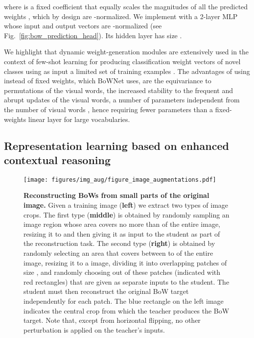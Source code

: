 \documentclass[final]{cvpr}
\begin{document}
where  is a fixed coefficient that equally scales the magnitudes of all the predicted weights , which by design are -normalized.
We implement  with a 2-layer MLP whose input and output vectors are -normalized (see Fig.~\ref{fig:bow_prediction_head}).
Its hidden layer has size .

We highlight that dynamic weight-generation modules are extensively used in the context of few-shot learning for producing classification weight vectors of novel classes using as input a limited set of training examples
\cite{gidaris2018dynamic,gomez2005evolving, qiao2018few}.
The advantages of using  instead of fixed weights, which BoWNet uses, are the equivariance to permutations of the visual words, the increased stability to the frequent and abrupt updates of the visual 
words, a number of parameters  independent from the number of visual words , hence requiring fewer parameters than a fixed-weights linear layer for large vocabularies.

\subsection{Representation learning based on enhanced contextual reasoning} \label{sec:contextual_reasoning_skills}

\begin{figure}[t]
\renewcommand{\captionfont}{\small}
\renewcommand{\captionlabelfont}{\bf}
\begin{center}
\texttt{[image: figures/img\_aug/figure\_image\_augmentations.pdf]}
\end{center}
\vspace{-15pt}
   \caption{
   \textbf{Reconstructing BoWs from small parts of the original image.}
   Given a training image (\textbf{left}) we extract two types of image crops.
   The first type (\textbf{middle}) is obtained by randomly sampling an image region whose area covers no more than  of the entire image, resizing it to  and then giving it as input to the student as part of the reconstruction task. 
   The second type (\textbf{right}) is obtained by randomly selecting an area that covers between  to  of the entire image, resizing it to a  image, dividing it into  overlapping patches of size , and randomly choosing  out of these  patches (indicated with red rectangles) that are given as  separate inputs to the student. The student must then reconstruct the original BoW target independently for each patch.
   The blue rectangle on the left image indicates the central  crop from which the teacher produces the BoW target.
   Note that, except from horizontal flipping, no other perturbation is applied on the teacher's inputs.
   }
   \vspace{-10pt}
\label{fig:img_aug}
\end{figure}
\end{document}
